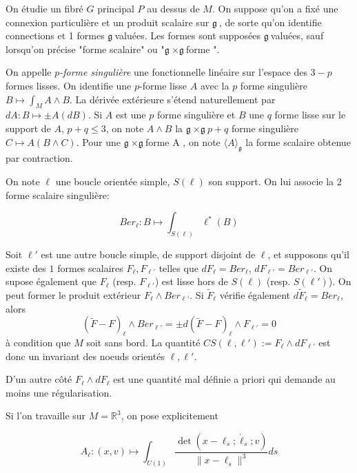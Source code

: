 \documentclass[10pt]{article}
\newcommand\g{$\mathfrak{g}\ $}
\begin{document}



On étudie un fibré $G$ principal $P$ au dessus de $M$. On suppose qu'on a fixé une connexion particulière et un produit scalaire sur \g, de sorte qu'on identifie connections et 1 formes \g valuées. Les formes sont supposées \g valuées, sauf lorsqu'on précise "forme scalaire" ou "\g$ \times $\g forme ".

On appelle \textit{$p$-forme singulière} une fonctionnelle linéaire sur l'espace des $3-p$ formes lisses. On identifie une $p$-forme lisse $A$ avec la $p$ forme singulière $B\mapsto \int_M A\wedge B$. La dérivée extérieure s'étend naturellement par $dA:B\mapsto \pm A(dB)$. Si $A$ est une $p$ forme singulière et $B$ une $q$ forme lisse sur le support de $A$, $p+q\leq 3$, on note $A\wedge B$ la \g$ \times $\g  $p+q$ forme singulière
$C\mapsto A(B\wedge C)$. Pour une \g$ \times $\g forme A , on note $\langle A\rangle_\mathfrak{g}$ la forme scalaire obtenue par contraction.

On note $\ell$ une boucle orientée simple, $S(\ell)$ son support. On lui associe la $2$ forme scalaire singulière:

\[Ber_\ell: B\mapsto \int_{S(\ell)} \ell^*(B) \]

Soit $\ell'$ est une autre boucle simple, de support disjoint de $\ell$, et supposons qu'il existe des $1$ formes scalaires $F_\ell, F_{\ell'}$ telles que $dF_\ell=Ber_\ell$, $dF_{\ell'}=Ber_{\ell'}$. On supose également que $F_{\ell}$ (resp. $F_{\ell'}$) est lisse hors de $S(\ell)$ (resp. $S(\ell')$). On peut former le produit extérieur $F_\ell\wedge Ber_{\ell'}$. Si $\tilde{F}_\ell$ vérifie également $d\tilde{F}_\ell=Ber_\ell$, alors \[
  (\tilde{F}-F)_\ell\wedge Ber_{\ell'}=\pm d(\tilde{F}-F)_\ell\wedge F_{\ell'}=0\]
à condition que $M$ soit sans bord. La quantité $CS(\ell,\ell'):=F_\ell\wedge dF_{\ell'}$ est donc un invariant des noeuds orientés $\ell,\ell'$.

D'un autre côté $F_\ell\wedge dF_\ell$ est une quantité mal définie a priori qui demande au moins une régularisation.

Si l'on travaille sur $M=\mathbb{R}^3$, on pose explicitement

\[A_\ell:(x,v)\mapsto \int_{U(1)} \frac{\det(x-\ell_s;\dot{\ell}_s;v)}{\|x-\ell_s\|^3} ds \]
\end{document}
